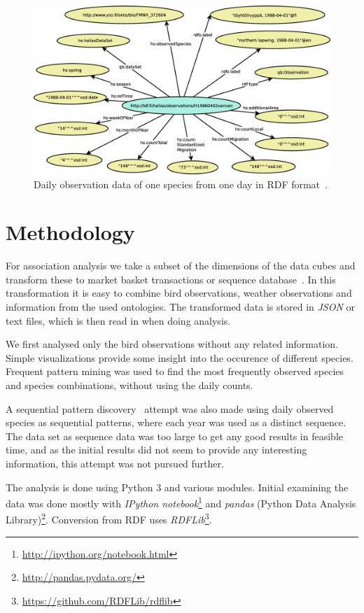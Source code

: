 \documentclass[english]{tktltiki2}
\begin{document}
\begin{figure}[htb]
\centering
\includegraphics[clip=true, width=\textwidth]{havaintograafi}
\caption{Daily observation data of one species from one day in RDF format~\cite{koho2015gradu}.}
\label{fig: havaintograafi}
\end{figure}


\section{Methodology}

For association analysis we take a subset of the dimensions of the data cubes and transform these to market basket transactions or sequence database~\cite{tan2006introduction}. In this transformation it is easy to combine bird observations, weather observations and information from the used ontologies. The transformed data is stored in \emph{JSON} or text files, which is then read in when doing analysis.

We first analysed only the bird observations without any related information. Simple visualizations provide some insight into the occurence of different species. Frequent pattern mining was used to find the most frequently observed species and species combinations, without using the daily counts.

A sequential pattern discovery~\cite{tan2006introduction} attempt was also made using daily observed species as sequential patterns, where each year was used as a distinct sequence. The data set as sequence data was too large to get any good results in feasible time, and as the initial results did not seem to provide any interesting information, this attempt was not pursued further.

The analysis is done using Python 3 and various modules. Initial examining the data was done mostly with \emph{IPython notebook}\footnote{\url{http://ipython.org/notebook.html}} and \emph{pandas} (Python Data Analysis Library)\footnote{\url{http://pandas.pydata.org/}}. Conversion from RDF uses \emph{RDFLib}\footnote{\url{https://github.com/RDFLib/rdflib}}. 
\end{document}
